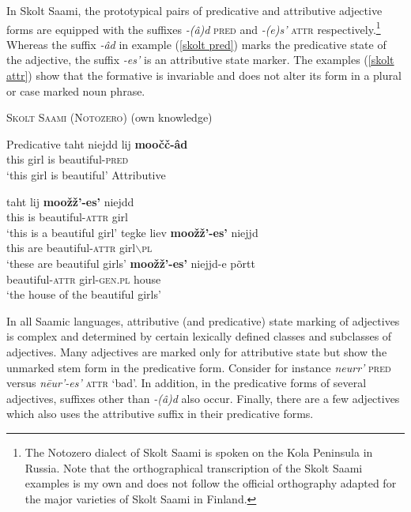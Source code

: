In Skolt Saami, the prototypical pairs of predicative and attributive adjective forms are equipped with the suffixes \textit{-(â)d} \textsc{pred} and \textit{-(e)s'} \textsc{attr} respectively.\footnote{The Notozero dialect of Skolt Saami is spoken on the Kola Peninsula in Russia. Note that the orthographical transcription of the Skolt Saami examples is my own and does not follow the official orthography adapted for the major varieties of Skolt Saami in Finland.} Whereas the suffix \textit{-âd} in example (\ref{skolt pred}) marks the predicative state of the adjective, the suffix \textit{-es'} is an attributive state marker. The examples (\ref{skolt attr}) show that the formative is invariable and does not alter its form in a plural or case marked noun phrase.
\newpage
\begin{exe}
\ex \textsc{Skolt Saami (Notozero)} (own knowledge)
\begin{xlist}
\ex	Predicative \label{skolt pred}
\gll	taht niejdd lij \textbf{moočč-âd}\\
	this girl is beautiful-\textsc{pred}\\
\glt	‘this girl is beautiful’
\ex	Attributive \label{skolt attr}
\begin{xlist}
\ex
\gll 	taht lij \textbf{moožž'-es'} niejdd\\
	this is beautiful-\textsc{attr} girl\\
\glt	‘this is a beautiful girl’
\ex	
\gll	tegke liev \textbf{moožž'-es'} niejjd\\
	this are beautiful-\textsc{attr} girl$\backslash$\textsc{pl}\\
\glt	‘these are beautiful girls’
\ex	
\gll	\textbf{moožž'-es'} niejjd-e põrtt\\
	beautiful-\textsc{attr} girl-\textsc{gen.pl} house\\
\glt	‘the house of the beautiful girls’
\end{xlist}
\end{xlist}
\end{exe}
In all Saamic languages, attributive (and predicative) state marking of adjectives is complex and determined by certain lexically defined classes and subclasses of adjectives. Many adjectives are marked only for attributive state but show the unmarked stem form in the predicative form. Consider for instance \textit{neurr'} \textsc{pred} versus \textit{nēur'-es'} \textsc{attr} ‘bad’. In addition, in the predicative forms of several adjectives, suffixes other than \textit{-(â)d} also occur. Finally, there are a few adjectives which also uses the attributive suffix in their predicative forms.

